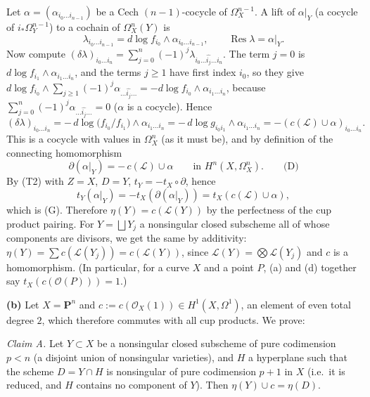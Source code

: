 \documentclass[11pt]{article}
\begin{document}
Let $\alpha=(\alpha_{i_0\dots i_{n-1}})$ be a Cech $(n-1)$-cocycle of $\Omega^{n-1}_X$. A lift of $\alpha|_Y$ (a cocycle of $i_*\Omega^{n-1}_Y$) to a cochain of $\Omega^n_X(Y)$ is
\[
\lambda_{i_0\dots i_{n-1}}=d\log f_{i_0}\wedge\alpha_{i_0\dots i_{n-1}},\qquad \operatorname{Res}\lambda=\alpha|_Y .
\]
Now compute $(\delta\lambda)_{i_0\dots i_n}=\sum_{j=0}^n(-1)^j\lambda_{i_0\dots\widehat{i_j}\dots i_n}$. The term $j=0$ is $d\log f_{i_1}\wedge\alpha_{i_1\dots i_n}$, and the terms $j\ge1$ have first index $i_0$, so they give $d\log f_{i_0}\wedge\sum_{j\ge1}(-1)^j\alpha_{\dots\widehat{i_j}\dots}=-d\log f_{i_0}\wedge\alpha_{i_1\dots i_n}$, because $\sum_{j=0}^n(-1)^j\alpha_{\dots\widehat{i_j}\dots}=0$ ($\alpha$ is a cocycle). Hence
\[
(\delta\lambda)_{i_0\dots i_n}=-\,d\log\!\big(f_{i_0}/f_{i_1}\big)\wedge\alpha_{i_1\dots i_n}=-\,d\log g_{i_0i_1}\wedge\alpha_{i_1\dots i_n}=-(c(\mathcal L)\cup\alpha)_{i_0\dots i_n}.
\]
This is a cocycle with values in $\Omega^n_X$ (as it must be), and by definition of the connecting homomorphism
\[
\partial(\alpha|_Y)=-\,c(\mathcal L)\cup\alpha\qquad\text{in }H^n(X,\Omega^n_X).\qquad\text{(D)}
\]
By (T2) with $Z=X$, $D=Y$, $t_Y=-t_X\circ\partial$, hence
\[
t_Y(\alpha|_Y)=-t_X(\partial(\alpha|_Y))=t_X(c(\mathcal L)\cup\alpha),
\]
which is (G). Therefore $\eta(Y)=c(\mathcal L(Y))$ by the perfectness of the cup product pairing. For $Y=\bigsqcup Y_j$ a nonsingular closed subscheme all of whose components are divisors, we get the same by additivity: $\eta(Y)=\sum c(\mathcal L(Y_j))=c(\mathcal L(Y))$, since $\mathcal L(Y)=\bigotimes\mathcal L(Y_j)$ and $c$ is a homomorphism. (In particular, for a curve $X$ and a point $P$, (a) and (d) together say $t_X(c(\mathcal O(P)))=1$.)

\medskip\noindent\textbf{(b)} Let $X=\mathbf P^n$ and $c:=c(\mathcal O_X(1))\in H^1(X,\Omega^1)$, an element of even total degree $2$, which therefore commutes with all cup products. We prove:

\emph{Claim A.} Let $Y\subset X$ be a nonsingular closed subscheme of pure codimension $p<n$ (a disjoint union of nonsingular varieties), and $H$ a hyperplane such that the scheme $D=Y\cap H$ is nonsingular of pure codimension $p+1$ in $X$ (i.e.\ it is reduced, and $H$ contains no component of $Y$). Then $\eta(Y)\cup c=\eta(D)$.
\end{document}
